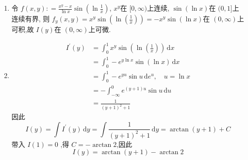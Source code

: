 \documentclass[lang=cn,12pt,color=green,fontset=none,thmcnt=section]{elegantbook}
\begin{document}
\begin{solution}
    \begin{enumerate}
        \item 令 $ f\left( x,y \right): = \frac{x^{y}-x }{\ln x }\sin  \left( \ln  \frac{1}{x} \right)    $, $ x^{y} $在 $ [0,\infty) $上连续, $ \sin \left( \ln x \right)  $在 $ (0,1] $上连续有界,     则 $ f_{y}\left( x,y \right) = x^{y} \sin  \left( \ln \left( \frac{1}{x} \right)  \right)   = -x^{y}\sin \left( \ln x \right) $在 $(0,\infty)  $上可积,故 $ I\left( y \right)  $在 $ \left( 0,\infty \right)  $上可微.     
        \item  $$
        \begin{aligned}
        I^{\prime} \left( y \right) & = \int_{0}^{1} x^{y} \sin \left( \ln \left( \frac{1}{x} \right)  \right) \,\mathrm{d} x\\ 
         & = \int_{0}^{1} - e^{y\ln x} \sin \left( \ln x \right)     \,\mathrm{d} x\\ 
          & = \int_{0}^{1} -e^{y u} \sin u \,\mathrm{d}  e^{u},\quad  u = \ln x\\ 
           & = -\int_{-\infty}^{0} e^{\left( y+ 1 \right)u } \sin u \,\mathrm{d} u\\ 
            & = \frac{1}{\left( y+ 1 \right)^{2}+ 1 }
        \end{aligned}
        $$因此 $$
        I\left( y \right) = \int I^{\prime} \left( y \right)\,\mathrm{d} y  = \int \frac{1}{\left( y+ 1 \right)^{2}+ 1 } \,\mathrm{d} y = \arctan \left( y+ 1 \right)+ C   
        $$带入 $ I\left( 1 \right) = 0  $ ,得 $ C = -\arctan 2 $,因此 $$
        I\left( y  \right) = \arctan \left( y+ 1 \right)-\arctan 2  
        $$ 
    \end{enumerate}
    
\end{solution}
\end{document}
